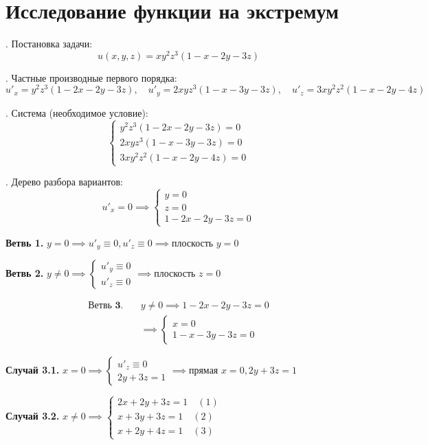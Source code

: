 \documentclass[12pt]{article}
\begin{document}
\section*{Исследование функции на экстремум}

. Постановка задачи: 
\[
u(x, y, z) = xy^2 z^3 (1 - x - 2y - 3z)
\]

. Частные производные первого порядка:
\[
u'_x = y^2 z^3 (1 - 2x - 2y - 3z), \quad
u'_y = 2xyz^3 (1 - x - 3y - 3z), \quad
u'_z = 3xy^2 z^2 (1 - x - 2y - 4z)
\]

. Система (необходимое условие):
\[
\begin{cases}
y^2 z^3 (1 - 2x - 2y - 3z) = 0 \\
2xyz^3 (1 - x - 3y - 3z) = 0 \\
3xy^2 z^2 (1 - x - 2y - 4z) = 0
\end{cases}
\]

. Дерево разбора вариантов:
\[
u'_x = 0 \implies \begin{cases} y = 0 \\ z = 0 \\ 1 - 2x - 2y - 3z = 0 \end{cases}
\]

\noindent \textbf{Ветвь 1.} \(y = 0 \implies u'_y \equiv 0, u'_z \equiv 0 \implies \text{плоскость } y = 0\)

\noindent \textbf{Ветвь 2.} \(y \neq 0 \implies \begin{cases} u'_y \equiv 0 \\ u'_z \equiv 0 \end{cases} \implies \text{плоскость } z = 0\)

\begin{align*}
\textbf{Ветвь 3.} \quad & y \neq 0 \implies 1 - 2x - 2y - 3z = 0 \\
&\implies \begin{cases} x = 0 \\ 1 - x - 3y - 3z = 0 \end{cases}
\end{align*}

\noindent \textbf{Случай 3.1.} \(x = 0 \implies \begin{cases} u'_z \equiv 0 \\ 2y + 3z = 1 \end{cases} \implies \text{прямая } x=0, 2y+3z=1\)

\noindent \textbf{Случай 3.2.} \(x \neq 0 \implies \begin{cases} 2x + 2y + 3z = 1 \quad (1) \\ x + 3y + 3z = 1 \quad (2) \\ x + 2y + 4z = 1 \quad (3) \end{cases}\)
\end{document}
